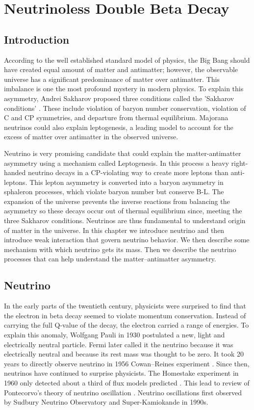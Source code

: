 \chapter{Neutrinoless Double Beta Decay}

\section{Introduction}
According to the well established standard model of physics, the Big Bang should have created equal amount of matter and antimatter; however, the observable universe has a significant predominance of matter over antimatter. This imbalance is one the most profound mystery in modern physics. To explain this asymmetry, Andrei Sakharov proposed three conditions called the 'Sakharov conditions' \cite{sakharov_1991}. These include violation of baryon number conservation, violation of C and CP symmetries, and departure from thermal equilibrium. Majorana neutrinos could also explain leptogenesis, a leading model to account for the excess of matter over antimatter in the observed universe.

Neutrino is very promising candidate that could explain the matter-antimatter asymmetry using a mechanism called Leptogenesis. In this process a heavy right-handed neutrino decays in a CP-violating way to create more leptons than anti-leptons. This lepton asymmetry is converted into a baryon asymmetry in sphaleron processes, which violate baryon number but conserve B-L. The expansion of the universe prevents the inverse reactions from balancing the asymmetry so these decays occur out of thermal equilibrium since, meeting the three Sakharov conditions. Neutrinos are thus fundamental to understand origin of matter in the universe. In this chapter we introduce neutrino and then introduce weak interaction that govern neutrino behavior. We then describe some mechanism with which neutrino gets its mass. Then we describe the neutrino processes that can help understand the matter–antimatter asymmetry.

\section{Neutrino}
In the early parts of the twentieth century, physicists were surprised to find that the electron in beta decay seemed to violate momentum conservation. Instead of carrying the full Q-value of the decay, the electron carried a range of energies. To explain this anomaly, Wolfgang Pauli in 1930 postulated a new, light and electrically neutral particle. Fermi later called it the neutrino because it was electrically neutral and because its rest mass was thought to be zero. It took 20 years to directly observe neutrino in 1956 Cowan–Reines experiment \cite{PhysRev.92.830}. Since then, neutrinos have continued to surprise physicists. The Homestake experiment in 1960 only detected about a third of flux models predicted \cite{Cleveland:1998nv}. This lead to review of Pontecorvo’s theory of neutrino oscillation \cite{Pontecorvo:1967fh}. Neutrino oscillations first observed by Sudbury Neutrino Observatory \cite{SNO:2001kpb} and Super-Kamiokande \cite{Super_Kamiokande_1998kpq} in 1990s. 

